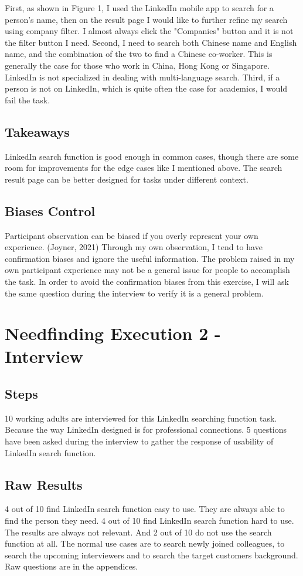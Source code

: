 \documentclass[
	letterpaper, %
]{jdf}
\begin{document}
First, as shown in Figure 1, I used the LinkedIn mobile app to search for a person's name, then on the result page I would like to further refine my search using company filter. I almost always click the "Companies" button and it is not the filter button I need. 
Second, I need to search both Chinese name and English name, and the combination of the two to find a Chinese co-worker. This is generally the case for those who work in China, Hong Kong or Singapore. LinkedIn is not specialized in dealing with multi-language search.
Third, if a person is not on LinkedIn, which is quite often the case for academics, I would fail the task.

\subsection{Takeaways}
LinkedIn search function is good enough in common cases, though there are some room for improvements for the edge cases like I mentioned above. The search result page can be better designed for tasks under different context.

\subsection{Biases Control}
Participant observation can be biased if you overly represent your own experience. (Joyner, 2021) Through my own observation, I tend to have confirmation biases and ignore the useful information. The problem raised in my own participant experience may not be a general issue for people to accomplish the task. In order to avoid the confirmation biases from this exercise, I will ask the same question during the interview to verify it is a general problem.

\section{Needfinding Execution 2 - Interview}
\subsection{Steps}
10 working adults are interviewed for this LinkedIn searching function task. Because the way LinkedIn designed is for professional connections. 5 questions have been asked during the interview to gather the response of usability of LinkedIn search function.

\subsection{Raw Results}
4 out of 10 find LinkedIn search function easy to use. They are always able to find the person they need. 4 out of 10 find LinkedIn search function hard to use. The results are always not relevant. And 2 out of 10 do not use the search function at all. The normal use cases are to search newly joined colleagues, to search the upcoming interviewers and to search the target customers background. Raw questions are in the appendices.
\end{document}
